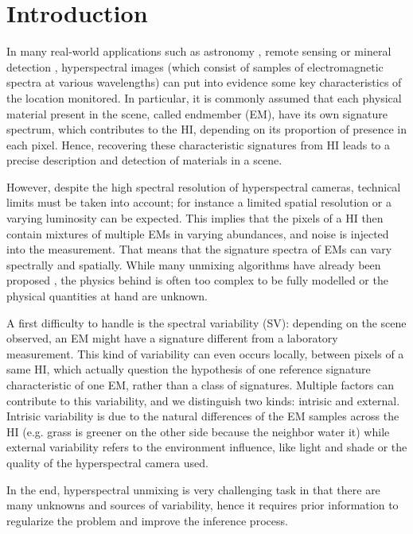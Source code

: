 \documentclass{article}
\begin{document}
\section{Introduction}
In many real-world applications such as astronomy \citep{kouyama2016}, remote sensing \citep{lu_2014} or mineral detection \citep{bandfield2002}, hyperspectral images (which consist of samples of electromagnetic spectra at various wavelengths) can put into evidence some key characteristics of the location monitored. In particular, it is commonly assumed that each physical material present in the scene, called endmember (EM), have its own signature spectrum, which contributes to the HI, depending on its proportion of presence in each pixel. Hence, recovering these characteristic signatures from HI leads to a precise description and detection of materials in a scene.

However, despite the high spectral resolution of hyperspectral cameras, technical limits must be taken into account; for instance a limited spatial resolution or a varying luminosity can be expected. This implies that the pixels of a HI then contain mixtures of multiple EMs in varying abundances, and noise is injected into the measurement. That means that the signature spectra of EMs can vary spectrally and spatially. While many unmixing algorithms have already been proposed \citep{borsoi_spectral_2020}, the physics behind is often too complex to be fully modelled or the physical quantities at hand are unknown.

A first difficulty to handle is the spectral variability (SV): depending on the scene observed, an EM might have a signature different from a laboratory measurement. This kind of variability can even occurs locally, between pixels of a same HI, which actually question the hypothesis of one reference signature characteristic of one EM, rather than a class of signatures. Multiple factors can contribute to this variability, and we distinguish two kinds: intrisic and external. Intrisic variability is due to the natural differences of the EM samples across the HI (e.g. grass is greener on the other side because the neighbor water it) while external variability refers to the environment influence, like light and shade or the quality of the hyperspectral camera used.

In the end, hyperspectral unmixing is very challenging task in that there are many unknowns and sources of variability, hence it requires prior information to regularize the problem and improve the inference process.
\end{document}
